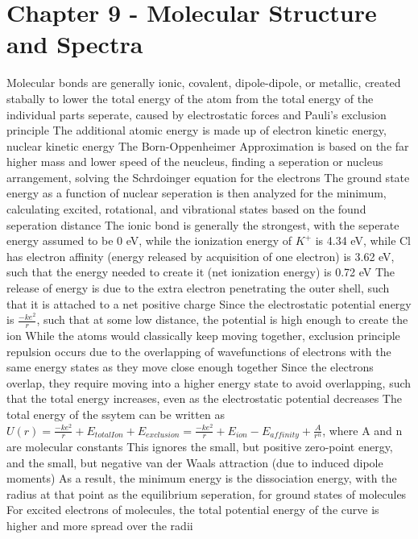 \documentclass[11 pt, twoside]{article}
\newenvironment{outline*}
{
	\begin{outline}[enumerate]
	}
	{\end{outline}
}
\begin{document}
\section{Chapter 9 - Molecular Structure and Spectra}
\begin{outline*}
\1 Molecular bonds are generally ionic, covalent, dipole-dipole, or metallic, created stabally to lower the total energy of the atom from the total energy of the individual parts seperate, caused by electrostatic forces and Pauli's exclusion principle
	\2 The additional atomic energy is made up of electron kinetic energy, nuclear kinetic energy
	\2 The Born-Oppenheimer Approximation is based on the far higher mass and lower speed of the neucleus, finding a seperation or nucleus arrangement, solving the Schrdoinger equation for the electrons
		\3 The ground state energy as a function of nuclear seperation is then analyzed for the minimum, calculating excited, rotational, and vibrational states based on the found seperation distance
\1 The ionic bond is generally the strongest, with the seperate energy assumed to be 0 eV, while the ionization energy of $K^+$ is 4.34 eV, while Cl has electron affinity (energy released by acquisition of one electron) is 3.62 eV, such that the energy needed to create it (net ionization energy) is 0.72 eV
	\2 The release of energy is due to the extra electron penetrating the outer shell, such that it is attached to a net positive charge
	\2 Since the electrostatic potential energy is $\frac{-ke^2}{r}$, such that at some low distance, the potential is high enough to create the ion
		\3 While the atoms would classically keep moving together, exclusion principle repulsion occurs due to the overlapping of wavefunctions of electrons with the same energy states as they move close enough together
		\3 Since the electrons overlap, they require moving into a higher energy state to avoid overlapping, such that the total energy increases, even as the electrostatic potential decreases
			\4 The total energy of the ssytem can be written as $U(r) = \frac{-ke^2}{r} + E_{totalIon} + E_{exclusion} = \frac{-ke^2}{r} + E_{ion} - E_{affinity} + \frac{A}{r^n}$, where A and n are molecular constants
			\4 This ignores the small, but positive zero-point energy, and the small, but negative van der Waals attraction (due to induced dipole moments)
	\2 As a result, the minimum energy is the dissociation energy, with the radius at that point as the equilibrium seperation, for ground states of molecules
		\3 For excited electrons of molecules, the total potential energy of the curve is higher and more spread over the radii

\end{outline*}
\end{document}
